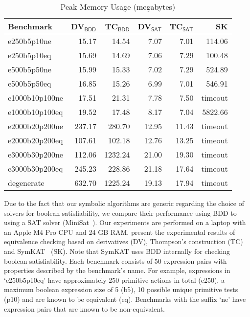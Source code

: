 \documentclass[conference]{IEEEtran}
\begin{document}
\begin{table}
\footnotesize
\centering
\setlength{\tabcolsep}{3pt}
\begin{tabular}{l r r r r r}
    Benchmark & DV$_{\textsf{BDD}}$ & TC$_{\textsf{BDD}}$ & DV$_{\textsf{SAT}}$ & TC$_{\textsf{SAT}}$ & SK \\
    \hline
    e250b5p10ne    & 15.17  & 14.54   & 7.07  & 7.01  &  114.06 \\
    e250b5p10eq    & 15.69  & 14.69   & 7.06  & 7.29  &  100.48 \\
    e500b5p50ne    & 15.99  & 15.33   & 7.02  & 7.29  &  524.89 \\
    e500b5p50eq    & 16.85  & 15.26   & 6.99  & 7.01  &  546.91 \\
    e1000b10p100ne & 17.51  & 21.31   & 7.78  & 7.50  & timeout \\
    e1000b10p100eq & 19.52  & 17.48   & 8.17  & 7.04  & 5822.66 \\
    e2000b20p200ne & 237.17 & 280.70  & 12.95 & 11.43 & timeout \\
    e2000b20p200eq & 107.61 & 102.18  & 12.76 & 13.25 & timeout \\
    e3000b30p200ne & 112.06 & 1232.24 & 21.00 & 19.30 & timeout \\
    e3000b30p200eq & 245.23 & 228.86  & 21.18 & 17.64 & timeout \\
    degenerate     & 632.70 & 1225.24 & 19.13 & 17.94 & timeout
\end{tabular}
\caption{Peak Memory Usage (megabytes)}\label{tab:benchmark-memory}
\vspace{-1em}
\end{table}

Due to the fact that our symbolic algorithms are generic regarding the choice of solvers for boolean satisfiability, we compare their performance using BDD to using a SAT solver (MiniSat~\cite{een_MINISAT_2004}). Our experiments are performed on a laptop with an Apple M4 Pro CPU and 24 GB RAM.  present the experimental results of equivalence checking based on derivatives (DV), Thompson's construction (TC) and SymKAT~\cite{pous_SymbolicAlgorithmsLanguage_2015} (SK). Note that SymKAT uses BDD internally for checking boolean satisfiability. Each benchmark consists of 50 expression pairs with properties described by the benchmark's name. For example, expressions in `e250b5p10eq' have approximately 250 primitive actions in total (e250), a maximum boolean expression size of 5 (b5), 10 possible unique primitive tests (p10) and are known to be equivalent (eq). Benchmarks with the suffix `ne' have expression pairs that are known to be non-equivalent. 
\end{document}
